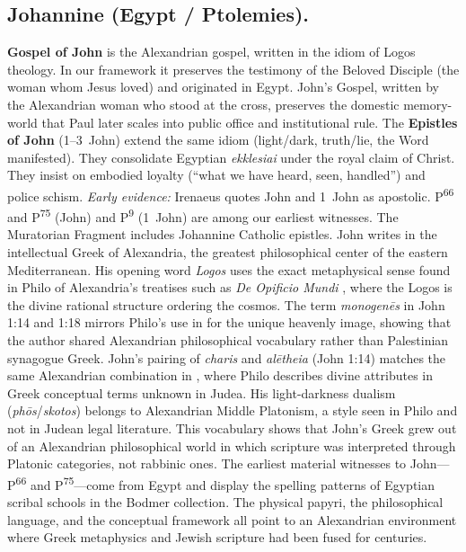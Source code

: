 \subsection{Johannine (Egypt / Ptolemies).}
\textbf{Gospel of John} is the Alexandrian gospel, written in the idiom of Logos theology.
In our framework it preserves the testimony of the Beloved Disciple (the woman whom Jesus loved) and originated in Egypt.
John's Gospel, written by the Alexandrian woman who stood at the cross, preserves the domestic memory-world that Paul later scales into public office and institutional rule.
The \textbf{Epistles of John} (1--3~John) extend the same idiom (light/dark, truth/lie, the Word manifested).
They consolidate Egyptian \textit{ekklesiai} under the royal claim of Christ.
They insist on embodied loyalty (“what we have heard, seen, handled”) and police schism.
\emph{Early evidence:} Irenaeus quotes John and 1~John as apostolic.
P\textsuperscript{66} and P\textsuperscript{75} (John) and P\textsuperscript{9} (1~John) are among our earliest witnesses.
The Muratorian Fragment includes Johannine Catholic epistles.
John writes in the intellectual Greek of Alexandria, the greatest philosophical center of the eastern Mediterranean.
His opening word \textit{Logos} uses the exact metaphysical sense found in Philo of Alexandria's treatises such as \textit{De Opificio Mundi} \cite[6--25]{philo:opificio}, where the Logos is the divine rational structure ordering the cosmos.
The term \textit{monogenēs} in John 1:14 and 1:18 mirrors Philo's use in \cite[41]{philo:sacrificiis} for the unique heavenly image, showing that the author shared Alexandrian philosophical vocabulary rather than Palestinian synagogue Greek.
John's pairing of \textit{charis} and \textit{alētheia} (John 1:14) matches the same Alexandrian combination in \cite[3.207]{philo:legall}, where Philo describes divine attributes in Greek conceptual terms unknown in Judea.
His light-darkness dualism (\textit{phōs}/\textit{skotos}) belongs to Alexandrian Middle Platonism, a style seen in Philo \cite[87--88]{philo:heres} and not in Judean legal literature.
This vocabulary shows that John's Greek grew out of an Alexandrian philosophical world in which scripture was interpreted through Platonic categories, not rabbinic ones.
The earliest material witnesses to John---P\textsuperscript{66} and P\textsuperscript{75}---come from Egypt and display the spelling patterns of Egyptian scribal schools in the Bodmer collection.
The physical papyri, the philosophical language, and the conceptual framework all point to an Alexandrian environment where Greek metaphysics and Jewish scripture had been fused for centuries.
